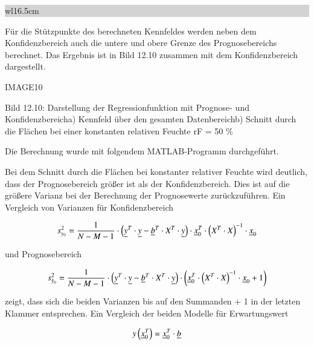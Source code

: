 \noindent
\colorbox{lightgray}{%
%
\renewcommand\arraystretch{0.6}%
\begin{tabular}{ wl{16.5cm} }
{\selectfont
{}}
\end{tabular}%
}\medskip

\noindent F\"{u}r die St\"{u}tzpunkte des berechneten Kennfeldes werden neben dem Konfidenzbereich auch die untere und obere Grenze des Prognosebereichs berechnet. Das Ergebnis ist in Bild 12.10 zusammen mit dem Konfidenzbereich dargestellt.

IMAGE10

\noindent Bild 12.10: Darstellung der Regressionfunktion mit Prognose- und Konfidenzbereicha) Kennfeld \"{u}ber den gesamten Datenbereichb) Schnitt durch die Fl\"{a}chen bei einer konstanten relativen Feuchte rF = 50 \%\newline

\noindent Die Berechnung wurde mit folgendem MATLAB-Programm durchgef\"{u}hrt.

\clearpage



\noindent Bei dem Schnitt durch die Fl\"{a}chen bei konstanter relativer Feuchte wird deutlich, dass der Prognosebereich gr\"{o}{\ss}er ist als der Konfidenzbereich. Dies ist auf die gr\"{o}{\ss}ere Varianz bei der Berechnung der Prognosewerte zur\"{u}ckzuf\"{u}hren. Ein Vergleich von Varianzen f\"{u}r Konfidenzbereich

\begin{equation}\label{eq:thirteeneighty}
s_{y_{0}}^{2} =\frac{1}{N-M-1} \cdot \left(\underline{y}^{T} \cdot \underline{y}-\underline{b}^{T} \cdot X^{T} \cdot \underline{y}\right)\cdot \underline{x}_{0}^{T} \cdot \left(X^{T} \cdot X\right)^{-1} \cdot \underline{x}_{0}
\end{equation}

\noindent und Prognosebereich

\begin{equation}\label{eq:thirteeneightyone}
s_{\hat{y}_{0} }^{2} =\frac{1}{N-M-1} \cdot \left(\underline{y}^{T} \cdot \underline{y}-\underline{b}^{T} \cdot X^{T} \cdot \underline{y}\right)\cdot \left(\underline{x}_{0}^{T} \cdot \left(X^{T} \cdot X\right)^{-1} \cdot \underline{x}_{0} +1\right)
\end{equation}

\noindent zeigt, dass sich die beiden Varianzen bis auf den Summanden + 1 in der letzten Klammer entsprechen. Ein Vergleich der beiden Modelle f\"{u}r Erwartungswert 

\begin{equation}\label{eq:thirteeneightytwo}
y\left(\underline{x}_{0}^{T} \right)=\underline{x}_{0}^{T} \cdot \underline{b}
\end{equation}


